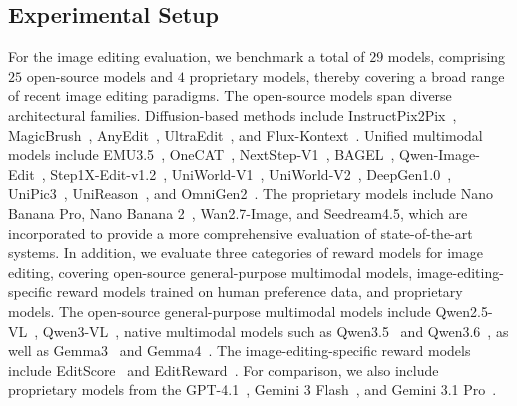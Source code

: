 \documentclass{llmxive}
\begin{document}
\subsection{Experimental Setup}
For the image editing evaluation, we benchmark a total of $29$ models, comprising $25$ open-source models and $4$ proprietary models, thereby covering a broad range of recent image editing paradigms.
The open-source models span diverse architectural families. Diffusion-based methods include InstructPix2Pix~\cite{brooks2023instructpix2pix}, MagicBrush~\cite{zhang2023magicbrush}, AnyEdit~\cite{yu2025anyedit}, UltraEdit~\cite{zhao2024ultraedit}, and Flux-Kontext~\cite{labs2025flux}. 
Unified multimodal models include  EMU3.5~\cite{cui2025emu3}, OneCAT~\cite{li2025onecat}, NextStep-V1~\cite{han2025nextstep}, BAGEL~\cite{deng2025emerging}, Qwen-Image-Edit~\cite{wu2025qwen}, Step1X-Edit-v1.2~\cite{liu2025step1x}, UniWorld-V1~\cite{lin2025uniworld},
UniWorld-V2~\cite{li2025uniworld},
DeepGen1.0~\cite{wang2026deepgen}, UniPic3~\cite{wei2026skywork}, UniReason~\cite{wang2026unireason}, and OmniGen2~\cite{wu2025omnigen2}.
The proprietary models include Nano Banana Pro\cite{gemini3pro}, Nano Banana 2~\cite{google2026gemini31flashimagepreview}, Wan2.7-Image\cite{wan}, and Seedream4.5\cite{seedream2025seedream}, which are incorporated to provide a more comprehensive evaluation of state-of-the-art systems. 
In addition, we evaluate three categories of reward models for image editing, covering open-source general-purpose multimodal models, image-editing-specific reward models trained on human preference data, and proprietary models. The open-source general-purpose multimodal models include Qwen2.5-VL~\cite{wang2024qwen2}, Qwen3-VL~\cite{bai2025qwen3}, native multimodal models such as Qwen3.5~\cite{qwen3.5} and Qwen3.6~\cite{qwen3.6-27b,qwen36_35b_a3b}, as well as Gemma3~\cite{Gemma3} and Gemma4~\cite{google2026gemma4}. 
The image-editing-specific reward models include EditScore~\cite{luo2025editscore} and EditReward~\cite{wu2025editreward}. 
For comparison, we also include proprietary models from the GPT-4.1~\cite{gpt4o20250325}, Gemini 3 Flash~\cite{google2026gemini31flashimagepreview}, and Gemini 3.1 Pro~\cite{google2026gemini31propreview}.  
\end{document}
